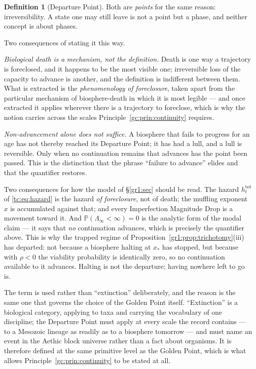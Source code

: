 \documentclass[11pt]{article}
\numberwithin{equation}{section}
\theoremstyle{plain}
\theoremstyle{definition}
\newtheorem{definition}[theorem]{Definition}
\theoremstyle{remark}
\newcommand{\PP}{\mathbb{P}}
\begin{document}
\begin{definition}[Departure Point]
Both are \emph{points} for the same reason: irreversibility. A state
one may still leave is not a point but a phase, and neither concept is
about phases.

Two consequences of stating it this way.

\emph{Biological death is a mechanism, not the definition.} Death is one
way a trajectory is foreclosed, and it happens to be the most visible
one; irreversible loss of the capacity to advance is another, and the
definition is indifferent between them. What is extracted is the
\emph{phenomenology of foreclosure}, taken apart from the particular
mechanism of biosphere-death in which it is most legible --- and once
extracted it applies wherever there is a trajectory to foreclose,
which is why the notion carries across the scales
Principle~\ref{gc:prin:continuity} requires.

\emph{Non-advancement alone does not suffice.} A biosphere that fails
to progress for an age has not thereby reached its Departure Point; it
has had a lull, and a lull is reversible. Only when no continuation
remains that advances has the point been passed. This is the
distinction that the phrase ``failure to advance'' elides and that the
quantifier restores.

Two consequences for how the model of \S\ref{gr1:sec} should be read.
The hazard $h^{\mathrm{tot}}_t$ of \eqref{tc:eq:hazard} is the hazard
\emph{of foreclosure}, not of death; the muffling exponent $x$ is
accumulated against that; and every Imperfection Magnitude Drop is a
movement toward it. And $\PP(\Lambda_\infty<\infty)=0$ is the analytic
form of the modal claim --- it says that \emph{no} continuation
advances, which is precisely the quantifier above. This is why the
trapped regime of Proposition~\ref{gr1:prop:trichotomy}(iii) has
departed: not because a biosphere halting at $x_\ast$ has stopped, but
because with $\rho<0$ the viability probability is identically zero, so
no continuation available to it advances. Halting is not the departure;
having nowhere left to go is.

The term is used rather than ``extinction'' deliberately, and the
reason is the same one that governs the choice of the Golden Point
itself. ``Extinction'' is a biological category, applying to taxa and
carrying the vocabulary of one discipline; the Departure Point must
apply at every scale the record contains --- to a Mesozoic lineage as
readily as to a biosphere tomorrow --- and must name an event in the
Aethic block universe rather than a fact about organisms. It is
therefore defined at the same primitive level as the Golden Point,
which is what allows Principle~\ref{gc:prin:continuity} to be stated at
all.


\end{definition}
\end{document}
